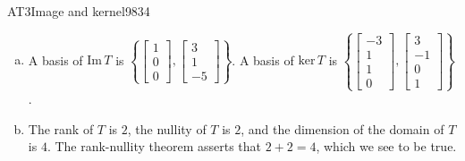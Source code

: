 \begin{exercise}{AT3}{Image and kernel}{9834}
\begin{exerciseAnswer}
\begin{enumerate}[(a)]
 
\item  

 A basis of \(\mathrm{Im}\,T\) is \(\left\{ \left[\begin{array}{c}
1 \\
0 \\
0
\end{array}\right] , \left[\begin{array}{c}
3 \\
1 \\
-5
\end{array}\right] \right\}\). A basis of \(\mathrm{ker}\,T\) is \(\left\{ \left[\begin{array}{c}
-3 \\
1 \\
1 \\
0
\end{array}\right] , \left[\begin{array}{c}
3 \\
-1 \\
0 \\
1
\end{array}\right] \right\}\). 

 
\item  

 The rank of \(T\) is \(2\), the nullity of \(T\) is \(2\), and the dimension of the domain of \(T\) is \(4\). The rank-nullity theorem asserts that \(2+2=4\), which we see to be true. 

 
\end{enumerate}

     \end{exerciseAnswer}
 \end{exercise}


